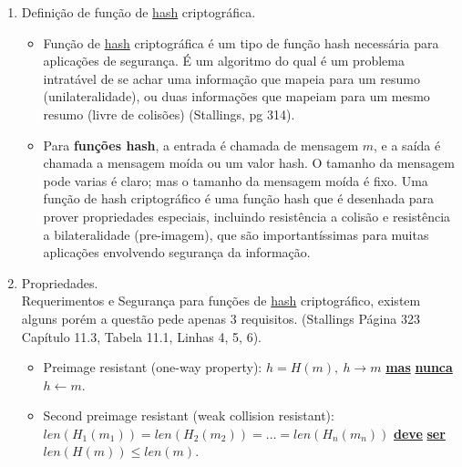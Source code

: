 \documentclass[12pt, a4paper]{article}
\begin{document}
\begin{enumerate}

\item Definição de função de \underline{hash} criptográfica.\\

  \begin{itemize}

    \item Função de \underline{hash} criptográfica é um tipo de função hash
    necessária para aplicações de segurança. É um algoritmo do qual é um
    problema intratável de se achar uma informação que mapeia para um resumo
    (unilateralidade), ou duas informações que mapeiam para um mesmo resumo
    (livre de colisões) (Stallings, pg 314).\\

    \item Para \textbf{funções hash}, a entrada é chamada de mensagem $m$, e a
    saída é chamada a mensagem moída ou um valor hash. O tamanho da mensagem
    pode varias é claro; mas o tamanho da mensagem moída é fixo. Uma função de
    hash criptográfico é uma função hash que é desenhada para prover
    propriedades especiais, incluindo resistência a colisão e resistência a
    bilateralidade (pre-imagem), que são importantíssimas para muitas aplicações
    envolvendo segurança da informação.\\

  \end{itemize}

\item Propriedades.\\

Requerimentos e Segurança para funções de \underline{hash} criptográfico,
existem alguns porém a questão pede apenas 3  requisitos. (Stallings Página 323
Capítulo 11.3, Tabela 11.1,  Linhas 4, 5, 6).\\

  \begin{itemize}
    \label{tiposataque}
    \item Preimage resistant (one-way property): $h = H(m),\ h \rightarrow m$
    \underline{\color{red} \textbf{mas}} \underline{\color{red} \textbf{nunca}}
    $h \leftarrow m$.\\

    \item Second preimage resistant (weak collision resistant): $len(H_1(m_1)) =
    len(H_2(m_2)) = \ldots = len(H_n(m_n))$ \underline{\color{red}
    \textbf{deve}} \underline{\color{red} \textbf{ser}} $len(H(m)) \le
    len(m)$.\\


\end{itemize}
\end{enumerate}
\end{document}
